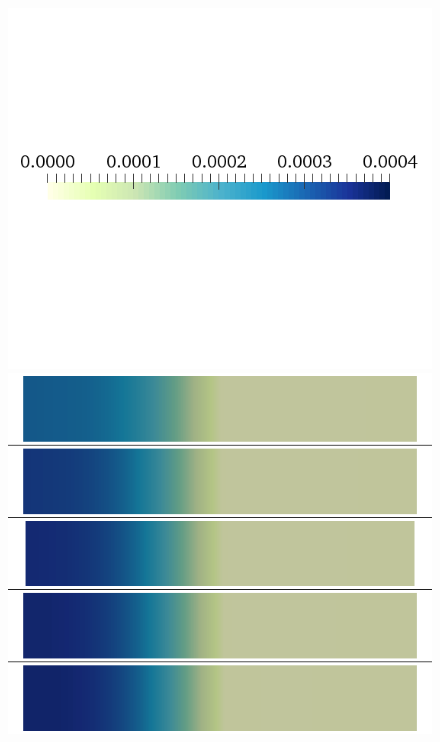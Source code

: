 \documentclass[12pt,a4paper]{article}
\begin{document}
%
\begin{figure}
\begin{minipage}{0.5\textwidth}
\includegraphics[trim=0cm 7cm 0cm 6cm, clip=true, width=1\linewidth]{legend_cai}
\includegraphics[trim=0cm 0cm 0cm 0cm, clip=true, width=1\linewidth]{cai_gcal}
    \end{minipage}
    \begin{minipage}{0.5\textwidth}

\end{minipage}
\end{figure}
\end{document}
